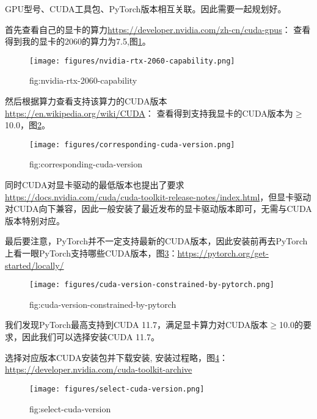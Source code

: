GPU型号、CUDA工具包、PyTorch版本相互关联。因此需要一起规划好。

首先查看自己的显卡的算力\url{https://developer.nvidia.com/zh-cn/cuda-gpus}：
查看得到我的显卡的2060的算力为7.5,图\ref{fig:nvidia-rtx-2060-capability}。

\begin{figure}[htbp]
    \centering
    \texttt{[image: figures/nvidia-rtx-2060-capability.png]}
    \caption{fig:nvidia-rtx-2060-capability}
    \label{fig:nvidia-rtx-2060-capability}
\end{figure}

然后根据算力查看支持该算力的CUDA版本\url{https://en.wikipedia.org/wiki/CUDA}：
查看得到支持我显卡的CUDA版本为$\geq$10.0，图\ref{fig:corresponding-cuda-version}。
\begin{figure}[htbp]
    \centering
    \texttt{[image: figures/corresponding-cuda-version.png]}
    \caption{fig:corresponding-cuda-version}
    \label{fig:corresponding-cuda-version}
\end{figure}

同时CUDA对显卡驱动的最低版本也提出了要求\url{https://docs.nvidia.com/cuda/cuda-toolkit-release-notes/index.html}，但显卡驱动对CUDA向下兼容，因此一般安装了最近发布的显卡驱动版本即可，无需与CUDA版本特别对应。




最后要注意，PyTorch并不一定支持最新的CUDA版本，因此安装前再去PyTorch上看一眼PyTorch支持哪些CUDA版本，图\ref{fig:cuda-version-constrained-by-pytorch}：\url{https://pytorch.org/get-started/locally/}
\begin{figure}[htbp]
    \centering
    \texttt{[image: figures/cuda-version-constrained-by-pytorch.png]}
    \caption{fig:cuda-version-constrained-by-pytorch}
    \label{fig:cuda-version-constrained-by-pytorch}
\end{figure}

我们发现PyTorch最高支持到CUDA 11.7，满足显卡算力对CUDA版本$\geq$10.0的要求，因此我们可以选择安装CUDA 11.7。

选择对应版本CUDA安装包并下载安装, 安装过程略，图\ref{fig:select-cuda-version}：
\url{https://developer.nvidia.com/cuda-toolkit-archive}

\begin{figure}[htbp]
	\centering
	\texttt{[image: figures/select-cuda-version.png]}
	\caption{fig:select-cuda-version}
	\label{fig:select-cuda-version}
\end{figure}

